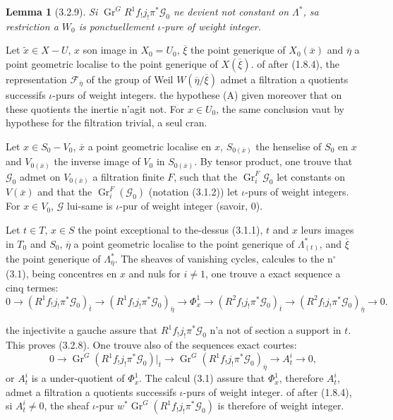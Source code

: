 \documentclass[12pt,a4paper]{article}
\theoremstyle{plain}
\newtheorem{lemma}[theorem]{Lemma}
\theoremstyle{definition}
\theoremstyle{remark}
\DeclareMathOperator{\Gr}{Gr}
\begin{document}
\begin{lemma}[3.2.9]
Si $\Gr^G R^1 f_! j_! \pi^* \mathscr{G}_0$ ne devient not constant on $\Lambda^*$, sa restriction a $W_0$ is ponctuellement $\iota$-pure of weight integer.
\end{lemma}

Let $\tilde{x} \in X - U$, $x$ son image in $X_0 = U_0$, $\overline{\xi}$ the point generique of $X_0(\overline{x})$ and $\overline{\eta}$ a point geometric localise to the point generique of $X(\overline{\xi})$. of after (1.8.4), the representation $\mathscr{F}_{\overline{\eta}}$ of the group of Weil $W(\overline{\eta}/\overline{\xi})$ admet a filtration a quotients successifs $\iota$-purs of weight integers. the hypothese (A) given moreover that on these quotients the inertie n'agit not. For $x \in U_0$, the same conclusion vaut by hypothese for the filtration trivial, a seul cran.

Let $x \in S_0 - V_0$, $\overline{x}$ a point geometric localise en $x$, $S_{0(\overline{x})}$ the henselise of $S_0$ en $x$ and $V_{0(\overline{x})}$ the inverse image of $V_0$ in $S_{0(\overline{x})}$. By tensor product, one trouve that $\mathscr{G}_0$ admet on $V_{0(\overline{x})}$ a filtration finite $F$, such that the $\Gr_i^F \mathscr{G}_0$ let constants on $V(\overline{x})$ and that the $\Gr_i^F(\mathscr{G}_0)$ (notation (3.1.2)) let $\iota$-purs of weight integers. For $x \in V_0$, $\mathscr{G}$ lui-same is $\iota$-pur of weight integer (savoir, $0$).

Let $t \in T$, $x \in S$ the point exceptional to the-dessus (3.1.1), $t$ and $x$ leurs images in $T_0$ and $S_0$, $\overline{\eta}$ a point geometric localise to the point generique of $\Lambda^*_{(t)}$, and $\overline{\xi}$ the point generique of $\Lambda^*_{\overline{\eta}}$. The sheaves of vanishing cycles, calcules to the n$^\circ$ (3.1), being concentres en $x$ and nuls for $i \neq 1$, one trouve a exact sequence a cinq termes:
\begin{equation}\label{eq:3.2.9.1}
0 \to (R^1 f_! j_! \pi^* \mathscr{G}_0)_{\overline{t}} \to (R^1 f_! j_! \pi^* \mathscr{G}_0)_{\overline{\eta}} \to \Phi^1_x \to (R^2 f_! j_! \pi^* \mathscr{G}_0)_{\overline{t}} \to (R^2 f_! j_! \pi^* \mathscr{G}_0)_{\overline{\eta}} \to 0.
\end{equation}

the injectivite a gauche assure that $R^1 f_! j_! \pi^* \mathscr{G}_0$ n'a not of section a support in $t$. This proves (3.2.8). One trouve also of the sequences exact courtes:
\[ 0 \to \Gr^G(R^1 f_! j_! \pi^* \mathscr{G}_0)|_{\overline{t}} \to \Gr^G(R^1 f_! j_! \pi^* \mathscr{G}_0)_{\overline{\eta}} \to A_t^i \to 0, \]
or $A_t^i$ is a under-quotient of $\Phi^1_x$. The calcul (3.1) assure that $\Phi^1_x$, therefore $A_t^i$, admet a filtration a quotients successifs $\iota$-purs of weight integer. of after (1.8.4), si $A_t^i \neq 0$, the sheaf $\iota$-pur $w^* \Gr^G(R^1 f_! j_! \pi^* \mathscr{G}_0)$ is therefore of weight integer.
\end{document}
